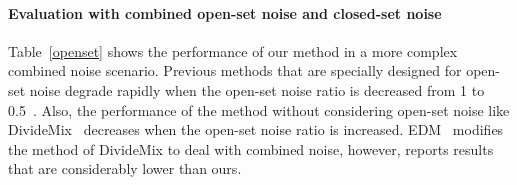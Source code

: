 \documentclass{bmvc2k}
\begin{document}
\paragraph{Evaluation with combined open-set noise and closed-set noise}
Table~\ref{openset} shows the performance of our method in a more complex combined noise scenario. Previous methods that are specially designed for open-set noise degrade rapidly when the open-set noise ratio is decreased from 1 to 0.5~\citep{rog,iterativeopenset}. Also, the performance of the method without considering open-set noise like DivideMix~\citep{dividemix} decreases when the open-set noise ratio is increased. EDM~\citep{evidentialmix} modifies the method of DivideMix to deal with combined noise, however, reports results that are considerably lower than ours. 

\begin{table}[htbp]
\begin{minipage}{0.5\linewidth}
\begin{center}
\end{center}
\end{minipage}
\end{table}
\end{document}
